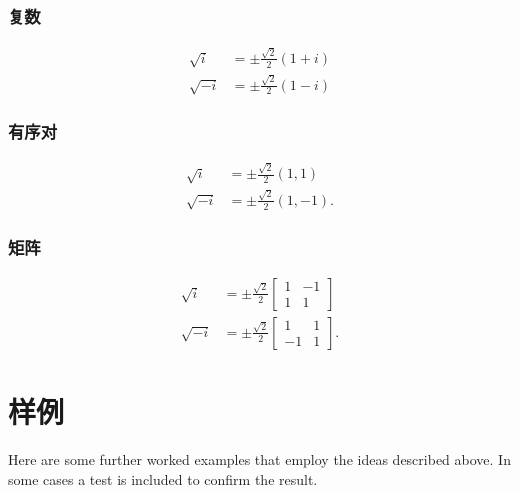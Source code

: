 \subsubsection*{复数}
$$
\begin{aligned}
\sqrt{i} & = \pm \frac{\sqrt{2}}{2}(1+i) \\
\sqrt{-i} & = \pm \frac{\sqrt{2}}{2}(1-i)
\end{aligned}
$$

\subsubsection*{有序对}
$$
\begin{aligned}
\sqrt{i} & = \pm \frac{\sqrt{2}}{2}(1,1) \\
\sqrt{-i} & = \pm \frac{\sqrt{2}}{2}(1,-1) .
\end{aligned}
$$

\subsubsection*{矩阵}
$$
\begin{aligned}
\sqrt{i} & = \pm \frac{\sqrt{2}}{2}\left[\begin{array}{cc}
1 & -1 \\
1 & 1
\end{array}\right] \\
\sqrt{-i} & = \pm \frac{\sqrt{2}}{2}\left[\begin{array}{cc}
1 & 1 \\
-1 & 1
\end{array}\right] .
\end{aligned}
$$

\section{样例}
Here are some further worked examples that employ the ideas described above. In some cases a test is included to confirm the result.

